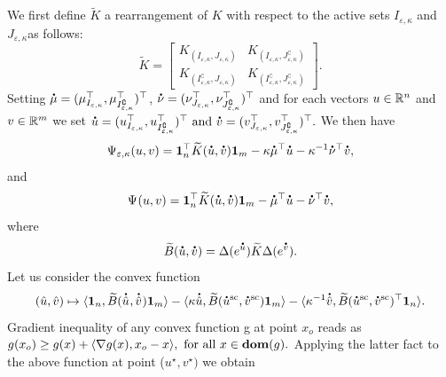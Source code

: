 We first define $\widetilde{K}$ a rearrangement of $K$ with respect to the active sets $I_{\varepsilon,\kappa}$ and $J_{\varepsilon,\kappa}$as follows:
\begin{equation*}
\widetilde{K} = 
\begin{bmatrix}
K_{(I_{\varepsilon,\kappa}, J_{\varepsilon,\kappa})} & K_{(I_{\varepsilon,\kappa}, J^\complement_{\varepsilon,\kappa})}\\
K_{(I^\complement_{\varepsilon,\kappa}, J_{\varepsilon,\kappa})} &K_{(I^\complement_{\varepsilon,\kappa}, J^\complement_{\varepsilon,\kappa})}
\end{bmatrix}.
\end{equation*}
Setting $\dt{\mu} = (\mu_{I_{\varepsilon,\kappa}}^\top, \mu_{I^\complement_{\varepsilon,\kappa}}^\top)^\top$, $\dt{\nu} = (\nu_{J_{\varepsilon,\kappa}}^\top, \nu_{J^\complement_{\varepsilon,\kappa}}^\top)^\top$ and for each vectors $u \in {\mathbb{R}}^n$ and $v\in {\mathbb{R}}^m$ we set $\dt{u} =(u_{I_{\varepsilon,\kappa}}^\top, u_{I^\complement_{\varepsilon,\kappa}}^\top)^\top  \text{ and } \dt{v} =(v_{J_{\varepsilon,\kappa}}^\top, v_{J^\complement_{\varepsilon,\kappa}}^\top)^\top.$
We then have 
\begin{equation*}
\Psi_{\varepsilon, \kappa} (u,v) = \mathbf 1_n^\top \widetilde{K}(\dt{u}, \dt{v}) \mathbf 1_m - \kappa \dt{\mu}^\top \dt{u} - \kappa^{-1} \dt{\nu}^\top \dt{v},
\end{equation*}
and 
\begin{equation*}
\Psi_{} (u,v) = \mathbf 1_n^\top \widetilde{K}(\dt{u}, \dt{v}) \mathbf 1_m - \dt{\mu}^\top \dt{u} - \dt{\nu}^\top \dt{v},
\end{equation*}
where
\begin{equation*}
  \widetilde{B}(\dt{u}, \dt{v}) = \Delta(e^{\dt{u}})\widetilde{K} \Delta(e^{\dt{v}}).
\end{equation*}
Let us consider the convex function
\begin{equation*}
	(\hat u, \hat v) \mapsto \inr{\mathbf 1_n, \widetilde{B}(\dt{\hat u}^{\text{}} ,\dt{\hat v}^{\text{}})\mathbf 1_m} - \inr{\kappa\dt{\hat u}, \widetilde{B}(\dt{u}^{\text{sc}} ,\dt{v}^{\text{sc}})\mathbf 1_m} - \inr{\kappa^{-1}\dt{\hat v}, \widetilde{B}(\dt{u}^{\text{sc}} ,\dt{v}^{\text{sc}})^\top\mathbf 1_n}.
\end{equation*}
Gradient inequality of any convex function g at point $x_o$ reads as $g(x_o) \geq g(x) + \langle \nabla g(x), x_o - x \rangle, \text{ for all } x \in \textbf{dom}(g).$
Applying the latter fact to the above function at point ($u^{\star}, v^{\star})$ we obtain
